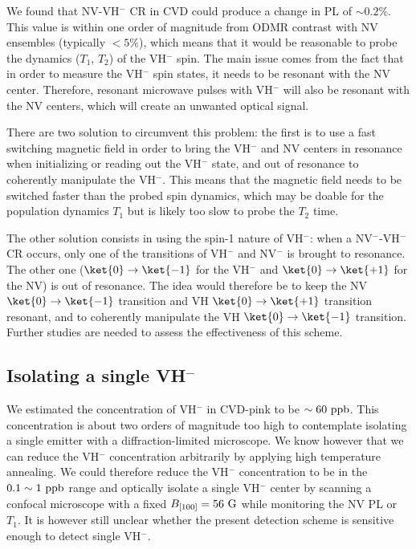 \documentclass[a4paper, 11pt]{report}
\begin{document}
We found that NV-VH$^-$ CR in CVD could produce a change in PL of $\sim 0.2 \%$. This value is within one order of magnitude from ODMR contrast with NV ensembles (typically $<5 \%$), which means that it would be reasonable to probe the dynamics ($T_1$, $T_2$) of the VH$^-$ spin. The main issue comes from the fact that in order to measure the VH$^-$ spin states, it needs to be resonant with the NV center. Therefore, resonant microwave pulses with VH$^-$ will also be resonant with the NV centers, which will create an unwanted optical signal.

There are two solution to circumvent this problem: the first is to use a fast switching magnetic field in order to bring the VH$^-$ and NV centers in resonance when initializing or reading out the VH$^-$ state, and out of resonance to coherently manipulate the VH$^-$. This means that the magnetic field needs to be switched faster than the probed spin dynamics, which may be doable for the population dynamics $T_1$ but is likely too slow to probe the $T_2$ time.

The other solution consists in using the spin-1 nature of VH$^-$: when a NV$^-$-VH$^-$ CR occurs, only one of the transitions of VH$^-$ and NV$^-$ is brought to resonance. The other one ($\ket{0} \to \ket{-1}$ for the VH$^-$ and $\ket{0} \to \ket{+1}$ for the NV) is out of resonance. The idea would therefore be to keep the NV $\ket{0} \to \ket{-1}$ transition and VH $\ket{0} \to \ket{+1}$ transition resonant, and to coherently manipulate the VH $\ket{0} \to \ket{-1}$ transition. Further studies are needed to assess the effectiveness of this scheme.

\subsection{Isolating a single VH$^-$}

We estimated the concentration of VH$^-$ in CVD-pink to be $\sim 60\ \rm ppb$. This concentration is about two orders of magnitude too high to contemplate isolating a single emitter with a diffraction-limited microscope. We know however that we can reduce the VH$^-$ concentration arbitrarily by applying high temperature annealing. We could therefore reduce the VH$^-$ concentration to be in the $0.1 \sim 1\ \rm ppb$ range and optically isolate a single VH$^-$ center by scanning a confocal microscope with a fixed $B_{[100]}=56\ \rm G$ while monitoring the NV PL or $T_1$. It is however still unclear whether the present detection scheme is sensitive enough to detect single VH$^-$.
\end{document}
